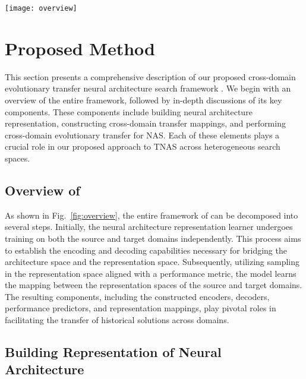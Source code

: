 \documentclass[../main.tex]{subfiles}
\begin{document}
\begin{figure*}[t!]
  \centering
  \texttt{[image: overview]}
  \caption{
    Overview of the \OUR{} framework.
    The whole process can be decomposed to three steps:
    (1) building representations with supervised and unsupervised representation learning;
    (2) learning mapping between representations from source and target domains;
    (3) transfer historical solutions from source domain with representation model and mapping to target domain.
  }\label{fig:overview}
\end{figure*}

\section{Proposed Method}\label{sec:method}

This section presents a comprehensive description of our proposed cross-domain evolutionary transfer neural architecture search framework \OUR{}.
We begin with an overview of the entire framework, followed by in-depth discussions of its key components.
These components include building neural architecture representation, constructing cross-domain transfer mappings, and performing cross-domain evolutionary transfer for NAS\@.
Each of these elements plays a crucial role in our proposed approach to TNAS across heterogeneous search spaces.

\subsection{Overview of \OUR{}}

As shown in Fig.~\ref{fig:overview}, the entire framework of \OUR{} can be decomposed into several steps.
Initially, the neural architecture representation learner undergoes training on both the source and target domains independently.
This process aims to establish the encoding and decoding capabilities necessary for bridging the architecture space and the representation space.
Subsequently, utilizing sampling in the representation space aligned with a performance metric, the model learns the mapping between the representation spaces of the source and target domains.
The resulting components, including the constructed encoders, decoders, performance predictors, and representation mappings, play pivotal roles in facilitating the transfer of historical solutions across domains.

\subsection{Building Representation of Neural Architecture}\label{sec:method-build-repre}
\end{document}
